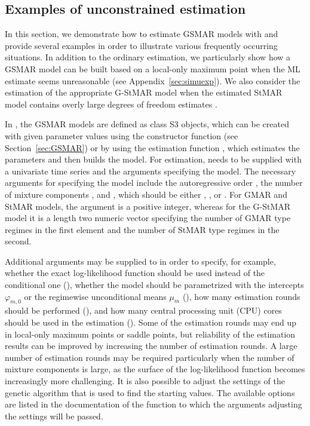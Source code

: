 \documentclass[nojss]{jss} %
\begin{document}
\subsection{Examples of unconstrained estimation}\label{sec:example_estim}

In this section, we demonstrate how to estimate GSMAR models with  and provide several examples in order to illustrate various frequently occurring situations. In addition to the ordinary estimation, we particularly show how a GSMAR model can be built based on a local-only maximum point when the ML estimate seems unreasonable (see Appendix~\ref{sec:simuexp}). We also consider the estimation of the appropriate G-StMAR model when the estimated StMAR model contains overly large degrees of freedom estimates \citep[see][Section 4]{Virolainen:2020}.

In , the GSMAR models are defined as class  S3 objects, which can be created with given parameter values using the constructor function  (see Section~\ref{sec:GSMAR}) or by using the estimation function , which estimates the parameters and then builds the model. For estimation,  needs to be supplied with a univariate time series and the arguments specifying the model. The necessary arguments for specifying the model include the autoregressive order , the number of mixture components , and , which should be either , , or . For GMAR and StMAR models, the argument  is a positive integer, whereas for the G-StMAR model it is a length two numeric vector specifying the number of GMAR type regimes in the first element and the number of StMAR type regimes in the second.

Additional arguments may be supplied to  in order to specify, for example, whether the exact log-likelihood function should be used instead of the conditional one (), whether the model should be parametrized with the intercepts $\varphi_{m,0}$ or the regimewise unconditional means $\mu_m$ (), how many estimation rounds should be performed (), and how many central processing unit (CPU) cores should be used in the estimation (). Some of the estimation rounds may end up in local-only maximum points or saddle points, but reliability of the estimation results can be improved by increasing the number of estimation rounds. A large number of estimation rounds may be required particularly when the number of mixture components is large, as the surface of the log-likelihood function becomes increasingly more challenging. It is also possible to adjust the settings of the genetic algorithm that is used to find the starting values. The available options are listed in the documentation of the function  to which the arguments adjusting the settings will be passed.
\end{document}
